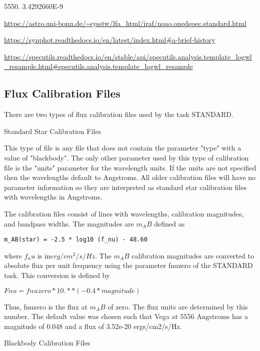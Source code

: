           5550.     3.4292660E-9

\url{https://astro.uni-bonn.de/~sysstw/lfa_html/iraf/noao.onedspec.standard.html}

\url{https://synphot.readthedocs.io/en/latest/index.html#a-brief-history}

\url{https://specutils.readthedocs.io/en/stable/api/specutils.analysis.template_logwl_resample.html#specutils.analysis.template_logwl_resample}

\subsection{Flux Calibration Files}

There are two types of flux calibration files used by the task
STANDARD.

Standard Star Calibration Files

This type of file is any file that does not contain the parameter
"type" with a value of "blackbody". The only other parameter used by
this type of calibration file is the "units" parameter for the
wavelength units. If the units are not specified then the wavelengths
default to Angstroms. All older calibration files will have no
parameter information so they are interpreted as standard star
calibration files with wavelengths in Angstroms.

The calibration files consist of lines with wavelengths, calibration
magnitudes, and bandpass widths. The magnitudes are $m_AB$ defined as

\begingroup \fontsize{10pt}{10pt}
\selectfont
\begin{verbatim} 
m_AB(star) = -2.5 * log10 (f_nu) - 48.60
\end{verbatim}
\endgroup

where $f_nu$ is in$ erg/cm^2/s/Hz$. The $m_AB$ calibration magnitudes are
converted to absolute flux per unit frequency using the parameter
fnuzero of the STANDARD task. This conversion is defined by

$Fnu = fnuzero * 10. ** (-0.4 * magnitude)$

Thus, fnuzero is the flux at $m_AB$ of zero. The flux units are
determined by this number. The default value was chosen such that Vega
at 5556 Angstroms has a magnitude of 0.048 and a flux of 3.52e-20
ergs/cm2/s/Hz.

Blackbody Calibration Files

